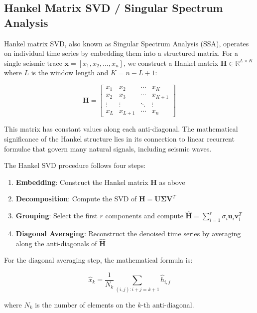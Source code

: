 \documentclass[11pt]{article}
\begin{document}
\subsection{Hankel Matrix SVD / Singular Spectrum Analysis}
Hankel matrix SVD, also known as Singular Spectrum Analysis (SSA), operates on individual time series by embedding them into a structured matrix. For a single seismic trace $\mathbf{x} = [x_1, x_2, \ldots, x_n]$, we construct a Hankel matrix $\mathbf{H} \in \mathbb{R}^{L \times K}$ where $L$ is the window length and $K = n - L + 1$:

\begin{equation}
\mathbf{H} = 
\begin{bmatrix}
x_1 & x_2 & \cdots & x_K \\
x_2 & x_3 & \cdots & x_{K+1} \\
\vdots & \vdots & \ddots & \vdots \\
x_L & x_{L+1} & \cdots & x_n
\end{bmatrix}
\end{equation}

This matrix has constant values along each anti-diagonal. The mathematical significance of the Hankel structure lies in its connection to linear recurrent formulae that govern many natural signals, including seismic waves.

The Hankel SVD procedure follows four steps:
\begin{enumerate}
\item \textbf{Embedding}: Construct the Hankel matrix $\mathbf{H}$ as above
\item \textbf{Decomposition}: Compute the SVD of $\mathbf{H} = \mathbf{U} \mathbf{\Sigma} \mathbf{V}^T$
\item \textbf{Grouping}: Select the first $r$ components and compute $\mathbf{\hat{H}} = \sum_{i=1}^{r} \sigma_i \mathbf{u}_i \mathbf{v}_i^T$
\item \textbf{Diagonal Averaging}: Reconstruct the denoised time series by averaging along the anti-diagonals of $\mathbf{\hat{H}}$
\end{enumerate}

For the diagonal averaging step, the mathematical formula is:

\begin{equation}
\hat{x}_k = \frac{1}{N_k} \sum_{(i,j): i+j=k+1} \hat{h}_{i,j}
\end{equation}

where $N_k$ is the number of elements on the $k$-th anti-diagonal.
\end{document}
